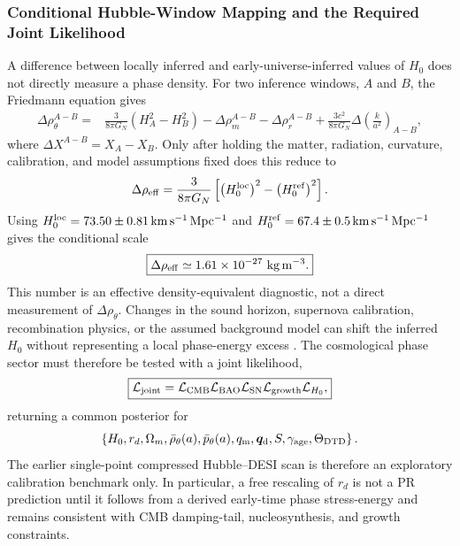 \documentclass[11pt]{article}
\begin{document}
\subsubsection{Conditional Hubble-Window Mapping and the Required Joint Likelihood}
\label{sec:hubble_window_conditional}

A difference between locally inferred and early-universe-inferred values of \(H_0\) does not directly measure a phase density. For two inference windows, \(A\) and \(B\), the Friedmann equation gives
\begin{equation}
\boxed{
\begin{aligned}
\Delta\rho_\theta^{A-B}
={}&
\frac{3}{8\pi G_N}
\left(H_A^2-H_B^2\right)
-
\Delta\rho_m^{A-B}
-
\Delta\rho_r^{A-B}
+
\frac{3c^2}{8\pi G_N}
\Delta\!\left(\frac{k}{a^2}\right)_{A-B},
\end{aligned}
}
\end{equation}
where \(\Delta X^{A-B}=X_A-X_B\). Only after holding the matter, radiation, curvature, calibration, and model assumptions fixed does this reduce to
\begin{equation}
\Delta\rho_{\rm eff}
=
\frac{3}{8\pi G_N}
\left[
\left(H_0^{\rm loc}\right)^2
-
\left(H_0^{\rm ref}\right)^2
\right].
\end{equation}
Using \(H_0^{\rm loc}=73.50\pm0.81\,\mathrm{km\,s^{-1}\,Mpc^{-1}}\) and \(H_0^{\rm ref}=67.4\pm0.5\,\mathrm{km\,s^{-1}\,Mpc^{-1}}\) gives the conditional scale
\begin{equation}
\boxed{
\Delta\rho_{\rm eff}
\simeq
1.61\times10^{-27}\ {\rm kg\,m^{-3}}.
}
\end{equation}
This number is an effective density-equivalent diagnostic, not a direct measurement of \(\Delta\rho_\theta\). Changes in the sound horizon, supernova calibration, recombination physics, or the assumed background model can shift the inferred \(H_0\) without representing a local phase-energy excess \cite{H0DN2026,Planck2018Cosmology}. The cosmological phase sector must therefore be tested with a joint likelihood,
\begin{equation}
\boxed{
{\cal L}_{\rm joint}
=
{\cal L}_{\rm CMB}
{\cal L}_{\rm BAO}
{\cal L}_{\rm SN}
{\cal L}_{\rm growth}
{\cal L}_{H_0},
}
\end{equation}
returning a common posterior for
\begin{equation}
\left\{
H_0,
r_d,
\Omega_m,
\bar\rho_\theta(a),
\bar p_\theta(a),
q_{\rm m},
\bm q_{\rm d},
S,
\gamma_{\rm age},
\Theta_{\rm DTD}
\right\}.
\end{equation}
The earlier single-point compressed Hubble--DESI scan is therefore an exploratory calibration benchmark only. In particular, a free rescaling of \(r_d\) is not a PR prediction until it follows from a derived early-time phase stress-energy and remains consistent with CMB damping-tail, nucleosynthesis, and growth constraints.
\end{document}
